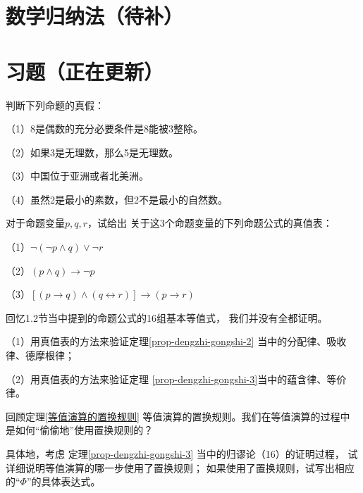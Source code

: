 \section{数学归纳法（待补）}
\section{习题（正在更新）}

\begin{prob}判断下列命题的真假：

（1）8是偶数的充分必要条件是8能被$3$整除。

（2）如果3是无理数，那么5是无理数。

（3）中国位于亚洲或者北美洲。

（4）虽然2是最小的素数，但2不是最小的自然数。

\end{prob}\vs

\begin{prob}对于命题变量$p,q,r$，试给出
关于这3个命题变量的下列命题公式的真值表：

（1）$\neg(\neg p\wedge q)\vee\neg r$

（2）$(p\wedge q)\rightarrow\neg p$

（3）$[(p\rightarrow q)\wedge(q\leftrightarrow r)]
\rightarrow(p\rightarrow r)$
\end{prob}\vs

\begin{prob}[基本等值公式的验证]
回忆1.2节当中提到的命题公式的16组基本等值式，
我们并没有全都证明。

（1）用真值表的方法来验证定理\ref{prop-dengzhi-gongshi-2}
当中的分配律、吸收律、德摩根律；

（2）用真值表的方法来验证定理
\ref{prop-dengzhi-gongshi-3}当中的蕴含律、等价律。
\end{prob}\vs

\begin{prob}[关于等值演算的置换规则]
回顾定理\ref{等值演算的置换规则}
等值演算的置换规则。我们在等值演算的过程中
是如何“偷偷地”使用置换规则的？

具体地，考虑
定理\ref{prop-dengzhi-gongshi-3}
当中的归谬论（16）的证明过程，
试详细说明等值演算的哪一步使用了置换规则；
如果使用了置换规则，试写出相应的“$\Phi$”的具体表达式。
\end{prob}\vs


